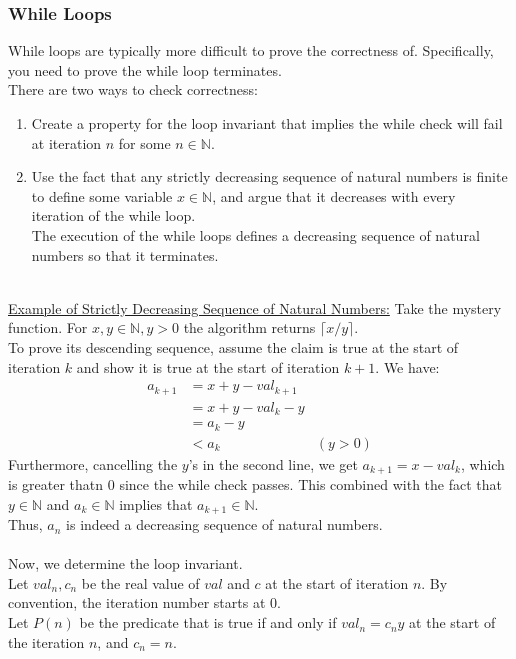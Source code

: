 \documentclass{article}
\begin{document}
\subsubsection{While Loops}
While loops are typically more difficult to prove the correctness of. Specifically, you need to prove the while loop terminates.\\
There are two ways to check correctness:
\begin{enumerate}
    \item Create a property for the loop invariant that implies the while check will fail at iteration $n$ for some $n \in \mathbb{N}$.
    \item Use the fact that any strictly decreasing sequence of natural numbers is finite to define some variable $x \in \mathbb{N}$, and argue that it decreases with every iteration of the while loop.\\
    The execution of the while loops defines a decreasing sequence of natural numbers so that it terminates.
\end{enumerate}
\\
\underline{Example of Strictly Decreasing Sequence of Natural Numbers:} Take the mystery function. For $x,y \in \mathbb{N}, y>0$ the algorithm returns $\lceil x/y\rceil$. \\
To prove its descending sequence, assume the claim is true at the start of iteration $k$ and show it is true at the start of iteration $k+1$. We have:
\begin{align*}
    a_{k+1} & = x+y - val_{k+1}\\
    & = x+y - val_k - y\\
    & = a_k - y\\
    & < a_k & (y>0)
\end{align*}
Furthermore, cancelling the $y$'s in the second line, we get $a_{k+1} = x - val_k$, which is greater thatn $0$ since the while check passes. This combined with the fact that $y \in \mathbb{N}$ and $a_k \in \mathbb{N}$ implies that $a_{k+1} \in \mathbb{N}$.\\
Thus, $a_n$ is indeed a decreasing sequence of natural numbers.\\
\\
Now, we determine the loop invariant.\\
Let $val_n, c_n$ be the real value of $val$ and $c$ at the start of iteration $n$. By convention, the iteration number starts at $0$.\\
Let $P(n)$ be the predicate that is true if and only if $val_n = c_ny$ at the start of the iteration $n$, and $c_n = n$.
\end{document}
